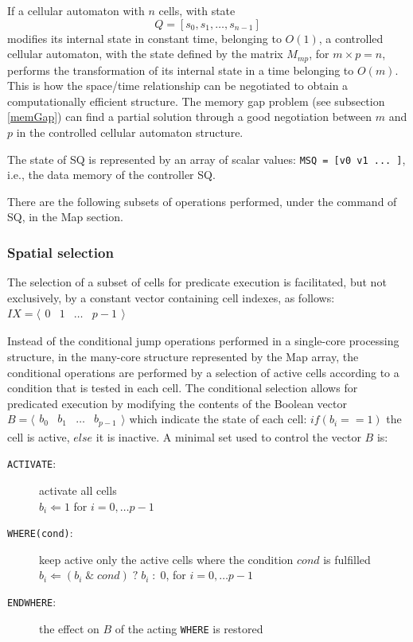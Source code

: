If a cellular automaton with $n$ cells, with state $$Q = [s_0, s_1, \ldots, s_{n-1}]$$ modifies its internal state in constant time, belonging to $O(1)$, a controlled cellular automaton,  with the state defined by the matrix $M_{mp}$, for $m \times p = n$, performs the transformation of its internal state in a time belonging to $O(m)$. This is how the space/time relationship can be negotiated  to obtain a computationally efficient structure. The memory gap problem (see subsection \ref{memGap}) can find a partial solution through a good negotiation between $m$ and $p$ in the controlled cellular automaton structure.

The state of SQ is represented by an array of scalar values: {\tt MSQ = [v0 v1 ... ]}, i.e., the data memory of the controller SQ. 

There are the following subsets of operations performed, under the command of SQ, in the Map section. 

\subsubsection{Spatial selection}

The selection of a subset of cells for predicate execution is facilitated, but not exclusively, by a constant vector containing cell indexes, as follows:
$IX=\langle
\begin{matrix}
0 & 1 & \ldots & p-1
\end{matrix}
\rangle$

Instead of the conditional jump operations performed in a single-core processing structure, in the many-core structure represented by the Map array, the conditional operations are performed by a selection of active cells according to a condition that is tested in each cell. The conditional selection allows for predicated execution by modifying the contents of the Boolean vector 
$B=\langle
\begin{matrix}
b_0 & b_1 & \ldots & b_{p-1}
\end{matrix}
\rangle$ which indicate the state of each cell: $if (b_i == 1)$ the cell is active, $else$ it is inactive. A minimal set used to control the vector $B$ is:
\begin{description}
    \item[{\tt ACTIVATE}:] activate all cells  \\ 
    $b_i \Leftarrow 1$ for $i = 0,  \ldots  p-1$
    \item[{\tt WHERE(cond)}:] keep active only the active cells where the condition $cond$ is fulfilled \\ 
    $b_i \Leftarrow (b_i \; \& \; cond) \; ? \; b_i \; : \; 0$, for $i = 0, \ldots  p-1$
    \item[{\tt ENDWHERE}:]  the effect on $B$ of the acting {\tt WHERE} is restored
\end{description}

